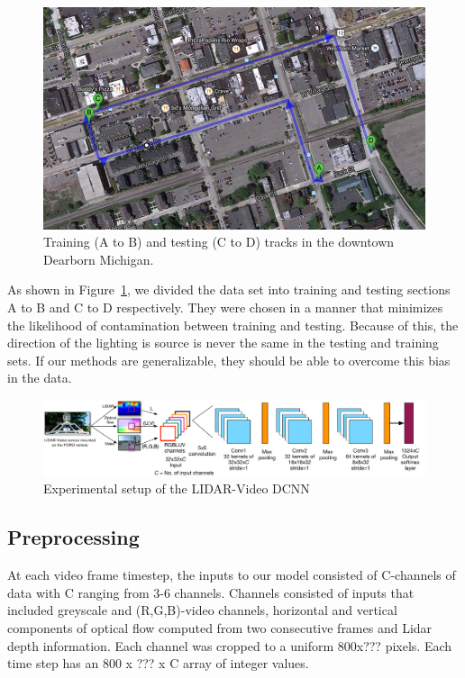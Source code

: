 \documentclass{article}
\begin{document}
\begin{figure}[htbp]
    \centering
        \includegraphics[scale=0.35]{Figures/ford_train_test_track.jpg}
    \caption{Training (A to B) and testing (C to D) tracks in the downtown Dearborn Michigan.}
    \label{fig:ford_train_test_track}
\end{figure}

As shown in Figure~\ref{fig:ford_train_test_track}, we divided the data set into training and testing sections A to B and C to D respectively. They were chosen in a manner that minimizes the likelihood of contamination between training and testing. Because of this, the direction of the lighting is source is never the same in the testing and training sets. If our methods are generalizable, they should be able to overcome this bias in the data.   

\begin{figure}[htbp]
    \centering
        \includegraphics[scale=0.35]{Figures/lidar_dcnn_setup1.pdf}
    \caption{Experimental setup of the LIDAR-Video DCNN}
    \label{fig:Figures_lidar_dcnn_setup1}
\end{figure}


\subsection{Preprocessing} %
\label{sub:preprocessing}
At each video frame timestep, the inputs to our model consisted of C-channels of data with C ranging from 3-6 channels. Channels consisted of inputs that included greyscale and (R,G,B)-video channels, horizontal and vertical components of optical flow computed from two consecutive frames and Lidar depth information. Each channel was cropped to a uniform 800x??? pixels. Each time step has an 800 x ??? x C array of integer values.
\end{document}
